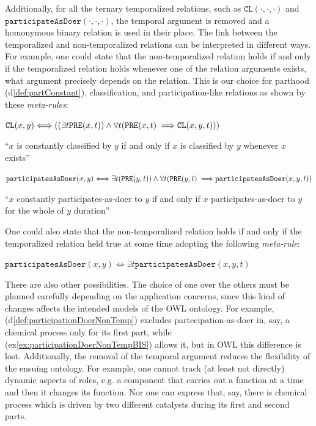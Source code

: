 \documentclass[sw]{iosart2x}
\newcommand{\bflist}{\begin{list}{}{\setlength{\topsep}{2mm}\setlength{\partopsep}{0mm}\setlength{\parsep}{0mm}\setlength{\leftmargin}{9mm}\setlength{\labelwidth}{8mm}}}
\newcommand{\eflist}{\end{list}}
\newcommand{\DefLabel}{\textrm{d}}
\newcommand{\ExLabel}{\textrm{ex}}
\newcounter{cntdef}
\newcommand{\mydf}[1]{\refstepcounter{cntdef}\begin{small}{\bf \DefLabel\thecntdef\label{def:#1}}\end{small}}
\newcommand{\myex}[1]{\refstepcounter{cntex}\begin{small}{\bf \ExLabel\thecntex\label{ex:#1}}\end{small}}
\newcounter{cntex}
\newcommand{\mytext}[1]{``#1''}
\newcommand{\refdf}[1]{({\DefLabel}\ref{#1})}
\newcommand{\refex}[1]{({\ExLabel}\ref{#1})}
\newcommand{\generalStyle}[1]{\texttt{#1}}
\newcommand{\biRel}[3]{\generalStyle{#1}(#2,#3)}
\newcommand{\triRel}[4]{\generalStyle{#1}(#2,#3,#4)}
\newcommand{\myiff}{\Longleftrightarrow}
\newcommand{\myfi}{\hspace{0.9mm} \Longrightarrow}
\newcommand{\OWL}{\textnormal{OWL}\xspace}
\newcommand{\DOLCECLbyBinary}[2]{\biRel{CL}{#1}{#2}}
\newcommand{\DOLCECLby}[3]{\triRel{CL}{#1}{#2}{#3}}
\newcommand{\DOLCEPRE}[2]{\biRel{PRE}{#1}{#2}}
\newcommand{\participateAsDoer}[3]{\triRel{participatesAsDoer}{#1}{#2}{#3}}
\newcommand{\participateAsDoerBinary}[2]{\biRel{participatesAsDoer}{#1}{#2}}
\newcommand{\playAs}[3]{\triRel{playAs}{#1}{#2}{#3}}
\newcommand{\TODOinline}[1]{{%
}}
\newcommand{\myComment}[1]{{\unskip \ignorespaces}}
\begin{document}
Additionally, for all the ternary temporalized relations, such as $\DOLCECLby{\cdot}{\cdot}{\cdot}$ \myComment{, $\playAs{\cdot}{\cdot}{\cdot}$,} 
and $\hspace{0pt}\texttt{participateAsDoer}(\cdot,\cdot,\cdot)$, the temporal argument is removed and a homonymous binary relation is used in their place.
The link between the temporalized and non-temporalized relations can be interpreted in different ways. For example, one could state that the non-temporalized relation holds if and only if the temporalized relation holds whenever one of the relation arguments exists, what argument precisely depends on the relation. This is our choice for parthood \refdf{def:partConstant}, classification, and participation-like relations as shown by these \textit{meta-rules}: %
\bflist
\item[\mydf{CLnontemp}$_{meta}$] $ \DOLCECLbyBinary{x}{y} \myiff ((\exists t \DOLCEPRE{x}{t}) \land \forall t (\DOLCEPRE{x}{t} \myfi  \DOLCECLby{x}{y}{t}))$ 
\item \mytext{$x$ is constantly classified by $y$ if and only if $x$ is classified by $y$ whenever $x$ exists}
\item[\mydf{participationDoerNonTemp}$_{meta}$] $ \participateAsDoerBinary{x}{y} \myiff \exists t (\DOLCEPRE{y}{t}) \land \forall t (\DOLCEPRE{y}{t} \myfi \participateAsDoer{x}{y}{t})$
\item \mytext{$x$ constantly participates-as-doer to $y$ if and only if $x$ participates-as-doer to $y$ for the whole of $y$ duration}
\eflist
One could also state that the non-temporalized relation holds if and only if the temporalized relation held true at some time adopting the following \textit{meta-rule}:%
\bflist
\item[\myex{participationDoerNonTempBIS}$_{meta}$] $ \participateAsDoerBinary{x}{y} \myiff \exists t \participateAsDoer{x}{y}{t}$
\eflist
There are also other possibilities. The choice of one over the others must be planned carefully depending on the application concerns, since this kind of changes affects the intended models of the \OWL ontology. For example, \refdf{def:participationDoerNonTemp} excludes partecipation-as-doer in, say, a chemical process only for its first part, while \refex{ex:participationDoerNonTempBIS} allows it, but in \OWL this difference is lost.
Additionally, the removal of the temporal argument reduces the flexibility of the ensuing ontology. For example, one cannot track (at least not directly) dynamic aspects of roles, e.g. a component that carries out a function at a time and then it changes its function. Nor one can express that, say, there is chemical process which is driven by two different catalysts during its first and second parts.
\end{document}
